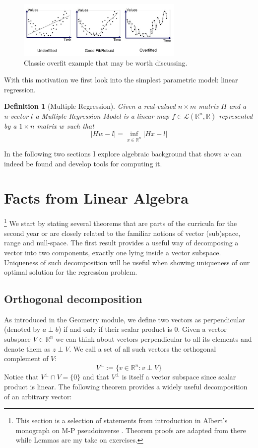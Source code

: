 \documentclass[a4paper]{article}
\theoremstyle{break}
\newtheorem{definition}{Definition}[section]
\newcommand{\R}{\mathbb{R}}
\begin{document}
\begin{figure}[!htbp]
\begin{center}
    \includegraphics[width=8cm]{overfit_poly.png}
\end{center}
\caption{Classic overfit example that may be worth discussing.}\label{img:overfit}
\end{figure} 

With this motivation we first look into the simplest parametric model: linear regression.

\begin{definition}[Multiple Regression]
    Given a real-valued $ n \times m$ matrix $H$ and a n-vector $l$ a Multiple Regression Model is a linear map $f \in \mathcal{L} ( \R ^n, \R)$ represented by a $ 1 \times n$ matrix $w$ such that
    \begin{equation}\label{def2}
        | H w - l | = \inf\limits_{x \in \R^n} | H x - l |
    \end{equation}
\end{definition}

In the following two sections I explore algebraic background that shows $ w $ can indeed be found and develop tools for computing it.

\section{Facts from Linear Algebra}

\footnote{This section is a selection of statements from introduction in Albert's monograph on M-P pseudoinverse \cite[pp6-12]{albert}. Theorem proofs are adapted from there while Lemmas are my take on exercises.}
%
We start by stating several theorems that are parts of the curricula for the second year or are closely related to the familiar notions of vector (sub)space, range and null-space. The first result provides a useful way of decomposing a vector into two components, exactly one lying inside a vector subspace. Uniqueness of such decomposition will be useful when showing uniqueness of our optimal solution for the regression problem.

\subsection{Orthogonal decomposition}
As introduced in the Geometry module, we define two vectors as perpendicular (denoted by $ a \perp b$) if and only if their scalar product is 0. Given a vector subspace $V \in \R^n$ we can think about vectors perpendicular to all its elements and denote them as $z \perp V$. We call a set of all such vectors the orthogonal complement of $V$:
$$ V^\perp := \{ v \in \R^n : v \perp V\} $$
Notice that $V^\perp \cap V = \{0\}$ and that $V^\perp$ is itself a vector subspace since scalar product is linear. The following theorem provides a widely useful decomposition of an arbitrary vector:
\end{document}
